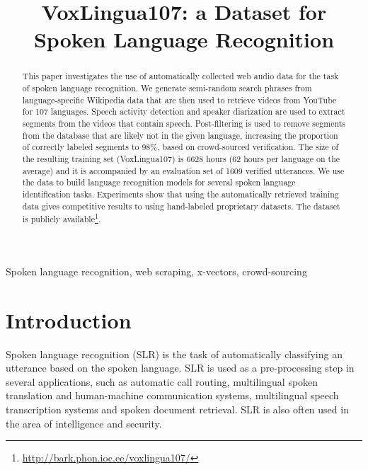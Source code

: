 \documentclass{article}
\title{VoxLingua107: a Dataset for Spoken Language Recognition}
\begin{document}
\ninept
\maketitle
\begin{abstract}
This paper investigates the use of automatically collected web audio data
for the task of spoken language recognition.
We generate semi-random search phrases from language-specific Wikipedia data that are 
then used to retrieve videos from YouTube for 107 languages.
Speech activity detection and
speaker diarization are used to extract segments from the videos that contain
speech. Post-filtering is used to remove segments from the database that are likely 
not in the given language, increasing the proportion of correctly labeled segments to 98\%, based on crowd-sourced verification. The size of the resulting training set (VoxLingua107) is 6628 hours (62 hours per language on the average) and it is accompanied by an evaluation set of 1609 verified utterances.
We use the data to build language recognition models for several spoken language identification
tasks. Experiments show that using the automatically retrieved training data gives competitive
results to using hand-labeled proprietary datasets. The dataset is publicly available\footnote{\url{http://bark.phon.ioc.ee/voxlingua107/}}.
\end{abstract}

\begin{keywords}
Spoken language recognition, web scraping, x-vectors, crowd-sourcing
\end{keywords}

\section{Introduction}

Spoken language recognition (SLR) is the task of automatically classifying an utterance based on the spoken language. SLR is used as a pre-processing step in several applications, such as automatic call routing, multilingual spoken translation and human-machine communication systems, multilingual speech transcription systems and spoken document retrieval. SLR is also often used in the area of intelligence and security.
\end{document}
